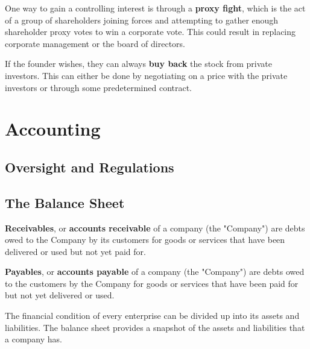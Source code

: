 \documentclass{article}
\begin{document}
    \begin{definition}
      One way to gain a controlling interest is through a \textbf{proxy fight}, which is the act of a group of shareholders joining forces and attempting to gather enough shareholder proxy votes to win a corporate vote. This could result in replacing corporate management or the board of directors. 
    \end{definition}

    \begin{definition}
      If the founder wishes, they can always \textbf{buy back} the stock from private investors. This can either be done by negotiating on a price with the private investors or through some predetermined contract.  
    \end{definition}

\section{Accounting} 

  \subsection{Oversight and Regulations}

  \subsection{The Balance Sheet}

    \begin{definition}
      \textbf{Receivables}, or \textbf{accounts receivable} of a company (the "Company") are debts owed to the Company by its customers for goods or services that have been delivered or used but not yet paid for. 

      \textbf{Payables}, or \textbf{accounts payable} of a company (the "Company") are debts owed to the customers by the Company for goods or services that have been paid for but not yet delivered or used. 
    \end{definition}

    The financial condition of every enterprise can be divided up into its assets and liabilities. The balance sheet provides a snapshot of the assets and liabilities that a company has. 
\end{document}
